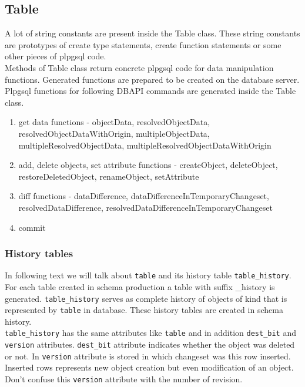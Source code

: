 \documentclass[deska]{subfiles}
\begin{document}
\subsection{Table}
A lot of string constants are present inside the Table class. These string constants are prototypes of create type statements, create function statements or some other pieces of plpgsql code.\\
Methods of Table class return concrete plpgsql code for data manipulation functions. Generated functions are prepared to be created on the database server.\\
Plpgsql functions for following DBAPI commands are generated inside the Table class.

\begin{enumerate}
    \item get data functions - objectData, resolvedObjectData, resolvedObjectDataWithOrigin, multipleObjectData, multipleResolvedObjectData, multipleResolvedObjectDataWithOrigin
    \item add, delete objects, set attribute functions - createObject, deleteObject, restoreDeletedObject, renameObject, setAttribute
    \item diff functions - dataDifference, dataDifferenceInTemporaryChangeset, resolvedDataDifference, resolvedDataDifferenceInTemporaryChangeset
    \item commit
\end{enumerate}

\subsubsection{History tables}
In following text we will talk about {\tt table} and its history table {\tt table\_history}.\\
For each table created in schema production a table with suffix \_history is generated. {\tt table\_history} serves as complete history of objects of kind that is represented by {\tt table} in database. These history tables are created in schema history.\\
{\tt table\_history} has the same attributes like {\tt table} and in addition {\tt dest\_bit} and {\tt version} attributes. {\tt dest\_bit} attribute indicates whether the object was deleted or not. In {\tt version} attribute is stored in which changeset was this row inserted. Inserted rows represents new object creation but even modification of an object. Don't confuse this {\tt version} attribute with the number of revision.
\end{document}
